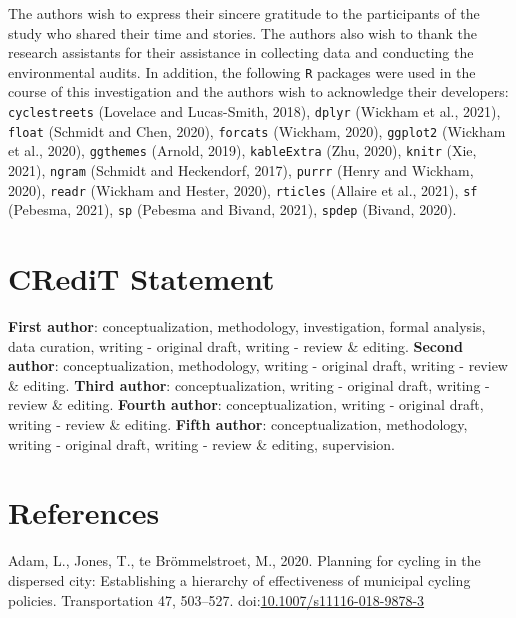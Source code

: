 \documentclass[]{elsarticle} %
\begin{document}
The authors wish to express their sincere gratitude to the participants
of the study who shared their time and stories. The authors also wish to
thank the research assistants for their assistance in collecting data
and conducting the environmental audits. In addition, the following
\texttt{R} packages were used in the course of this investigation and
the authors wish to acknowledge their developers: \texttt{cyclestreets}
(Lovelace and Lucas-Smith, 2018), \texttt{dplyr} (Wickham et al., 2021),
\texttt{float} (Schmidt and Chen, 2020), \texttt{forcats} (Wickham,
2020), \texttt{ggplot2} (Wickham et al., 2020), \texttt{ggthemes}
(Arnold, 2019), \texttt{kableExtra} (Zhu, 2020), \texttt{knitr} (Xie,
2021), \texttt{ngram} (Schmidt and Heckendorf, 2017), \texttt{purrr}
(Henry and Wickham, 2020), \texttt{readr} (Wickham and Hester, 2020),
\texttt{rticles} (Allaire et al., 2021), \texttt{sf} (Pebesma, 2021),
\texttt{sp} (Pebesma and Bivand, 2021), \texttt{spdep} (Bivand, 2020).

\hypertarget{sec:credit}{%
\section{CRediT Statement}\label{sec:credit}}

\textbf{First author}: conceptualization, methodology, investigation,
formal analysis, data curation, writing - original draft, writing -
review \& editing. \textbf{Second author}: conceptualization,
methodology, writing - original draft, writing - review \& editing.
\textbf{Third author}: conceptualization, writing - original draft,
writing - review \& editing. \textbf{Fourth author}: conceptualization,
writing - original draft, writing - review \& editing. \textbf{Fifth
author}: conceptualization, methodology, writing - original draft,
writing - review \& editing, supervision.

\hypertarget{sec:references}{%
\section*{References}\label{sec:references}}

\hypertarget{refs}{}
\leavevmode\hypertarget{ref-adamPlanningCyclingDispersed2020}{}%
Adam, L., Jones, T., te Brömmelstroet, M., 2020. Planning for cycling in
the dispersed city: Establishing a hierarchy of effectiveness of
municipal cycling policies. Transportation 47, 503--527.
doi:\href{https://doi.org/10.1007/s11116-018-9878-3}{10.1007/s11116-018-9878-3}
\end{document}
